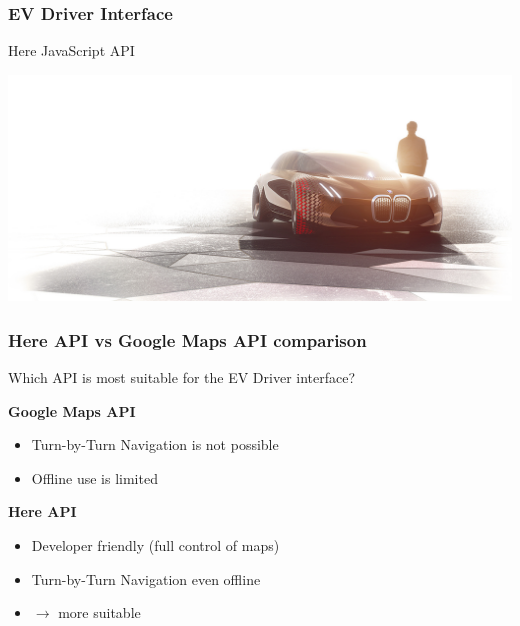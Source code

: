 \begin{frame}
	\frametitle{EV Driver Interface}

	Here JavaScript API

	\vspace*{-3mm}
	\begin{minipage}[t][0cm]{\paperwidth}%
		\hspace*{-\PraesentationSeitenrand}%
		\includegraphics[width=\paperwidth]{images/bmw2.png}
	\end{minipage}

\end{frame}
\clearpage




\begin{frame}
	\frametitle{Here API vs Google Maps API comparison}

	Which API is most suitable for the EV Driver interface?

	\vspace{-8mm}
	\begin{PraesentationAufzaehlung}

		\item \textbf{Google Maps API}
		\begin{itemize}
			\item Turn-by-Turn Navigation is not possible
			\item Offline use is limited
		\end{itemize}

		\item \textbf{Here API}
		\begin{itemize}
			\item Developer friendly (full control of maps)
			\item Turn-by-Turn Navigation even offline
			\item $\rightarrow$ more suitable
		\end{itemize}

	\end{PraesentationAufzaehlung}
\end{frame}
\clearpage




